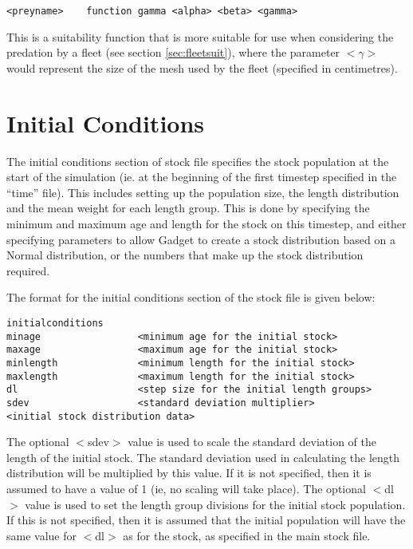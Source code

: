 \documentclass[]{book}
\begin{document}
\begin{verbatim}
<preyname>    function gamma <alpha> <beta> <gamma>
\end{verbatim}

This is a suitability function that is more suitable for use when
considering the predation by a fleet (see
section \ref{sec:fleetsuit}), where the parameter \(<\gamma>\) would
represent the size of the mesh used by the fleet (specified in
centimetres).

\hypertarget{sec:stockinitial}{%
\section{Initial Conditions}\label{sec:stockinitial}}

The initial conditions section of stock file specifies the stock
population at the start of the simulation (ie. at the beginning of the
first timestep specified in the ``time'' file). This includes setting up
the population size, the length distribution and the mean weight for
each length group. This is done by specifying the minimum and maximum
age and length for the stock on this timestep, and either specifying
parameters to allow Gadget to create a stock distribution based on a
Normal distribution, or the numbers that make up the stock distribution
required.

The format for the initial conditions section of the stock file is given
below:

\begin{verbatim}
initialconditions
minage                 <minimum age for the initial stock>
maxage                 <maximum age for the initial stock>
minlength              <minimum length for the initial stock>
maxlength              <maximum length for the initial stock>
dl                     <step size for the initial length groups>
sdev                   <standard deviation multiplier>
<initial stock distribution data>
\end{verbatim}

The optional \(<\)sdev\(>\) value is used to scale the standard deviation of
the length of the initial stock. The standard deviation used in
calculating the length distribution will be multiplied by this value. If
it is not specified, then it is assumed to have a value of 1 (ie, no
scaling will take place). The optional \(<\)dl\(>\) value is used to set the
length group divisions for the initial stock population. If this is not
specified, then it is assumed that the initial population will have the
same value for \(<\)dl\(>\) as for the stock, as specified in the main stock
file.
\end{document}
